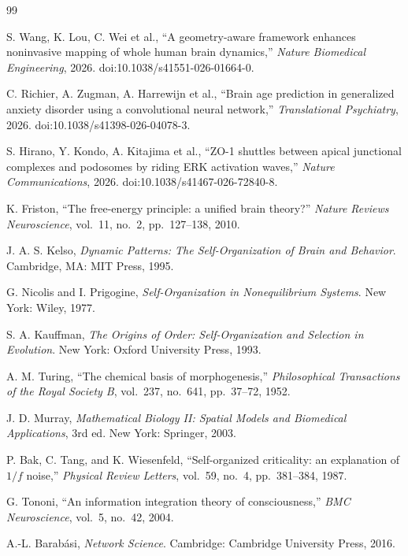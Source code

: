 \documentclass[11pt,a4paper]{article}
\theoremstyle{plain}
\theoremstyle{definition}
\begin{document}
\begin{thebibliography}{99}
\sloppy

S. Wang, K. Lou, C. Wei et al.,
``A geometry-aware framework enhances noninvasive mapping of whole human brain dynamics,''
\textit{Nature Biomedical Engineering}, 2026.
doi:10.1038/s41551-026-01664-0.

C. Richier, A. Zugman, A. Harrewijn et al.,
``Brain age prediction in generalized anxiety disorder using a convolutional neural network,''
\textit{Translational Psychiatry}, 2026.
doi:10.1038/s41398-026-04078-3.

S. Hirano, Y. Kondo, A. Kitajima et al.,
``ZO-1 shuttles between apical junctional complexes and podosomes by riding ERK activation waves,''
\textit{Nature Communications}, 2026.
doi:10.1038/s41467-026-72840-8.

K. Friston,
``The free-energy principle: a unified brain theory?''
\textit{Nature Reviews Neuroscience},
vol.\ 11, no.\ 2, pp.\ 127--138, 2010.

J. A. S. Kelso,
\textit{Dynamic Patterns: The Self-Organization of Brain and Behavior}.
Cambridge, MA: MIT Press, 1995.

G. Nicolis and I. Prigogine,
\textit{Self-Organization in Nonequilibrium Systems}.
New York: Wiley, 1977.

S. A. Kauffman,
\textit{The Origins of Order: Self-Organization and Selection in Evolution}.
New York: Oxford University Press, 1993.

A. M. Turing,
``The chemical basis of morphogenesis,''
\textit{Philosophical Transactions of the Royal Society B},
vol.\ 237, no.\ 641, pp.\ 37--72, 1952.

J. D. Murray,
\textit{Mathematical Biology II: Spatial Models and Biomedical Applications},
3rd ed.
New York: Springer, 2003.

P. Bak, C. Tang, and K. Wiesenfeld,
``Self-organized criticality: an explanation of $1/f$ noise,''
\textit{Physical Review Letters},
vol.\ 59, no.\ 4, pp.\ 381--384, 1987.

G. Tononi,
``An information integration theory of consciousness,''
\textit{BMC Neuroscience},
vol.\ 5, no.\ 42, 2004.

A.-L. Barab{\'a}si,
\textit{Network Science}.
Cambridge: Cambridge University Press, 2016.


\end{thebibliography}
\end{document}
